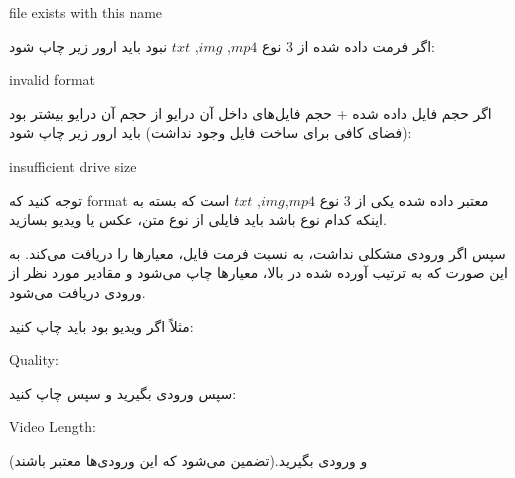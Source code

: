 \documentclass[]{article}
\begin{document}
  \begin{tcolorbox}[boxrule=0pt]
	\begin{latin}
  	  \large{
  	 file exists with this name
		}
	\end{latin}
\end{tcolorbox}



اگر فرمت داده شده از 3 نوع $mp4$, $img$, $txt$ نبود باید ارور زیر چاپ شود:

  \begin{tcolorbox}[boxrule=0pt]
	\begin{latin}
  	  \large{
  	 invalid format
		}
	\end{latin}
\end{tcolorbox}




اگر حجم فایل داده شده + حجم فایل‌های داخل آن درایو از حجم آن درایو بیشتر بود (فضای کافی برای ساخت فایل وجود نداشت) باید ارور زیر چاپ شود:

 \begin{tcolorbox}[boxrule=0pt]
	\begin{latin}
  	  \large{
  	 insufficient drive size
		}
	\end{latin}
\end{tcolorbox}

توجه کنید که format معتبر داده شده یکی از 3 نوع $mp4$,$img$, $txt$ است که بسته به اینکه کدام نوع باشد باید فایلی از نوع متن، عکس یا ویدیو بسازید.

سپس اگر ورودی مشکلی نداشت، به نسبت فرمت فایل، معیارها را دریافت می‌کند. به این صورت که به ترتیب آورده شده در بالا، معیارها چاپ می‌شود و مقادیر مورد نظر از ورودی دریافت می‌شود. 

مثلاً اگر ویدیو بود باید چاپ کنید:

 \begin{tcolorbox}[boxrule=0pt]
	\begin{latin}
  	  \large{
  	 Quality:
		}
	\end{latin}
\end{tcolorbox}


سپس ورودی بگیرید و سپس چاپ کنید:

 \begin{tcolorbox}[boxrule=0pt]
	\begin{latin}
  	  \large{
  	Video Length:
		}
	\end{latin}
\end{tcolorbox}


و ورودی بگیرید.(تضمین می‌شود که این ورودی‌ها معتبر باشند)
\end{document}
